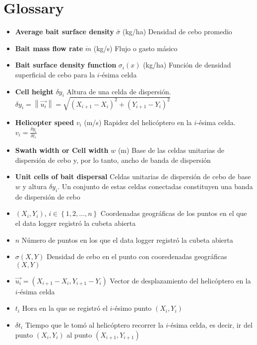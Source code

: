 \section{Glossary}
\begin{itemize}
  \item \textbf{Average bait surface density} $\bar{\sigma}$ (kg/ha) Densidad de cebo promedio

  \item \textbf{Bait mass flow rate} $\dot{m}$ (kg/s) Flujo o gasto m\'asico

  \item \textbf{Bait surface density function} $\sigma_i(x)$ (kg/ha) Funci\'on de densidad superficial de cebo para la $i$-\'esima celda

  \item \textbf{Cell height} $\delta y_i$ Altura de una celda de dispersi\'on. $\delta y_i=\left\|\vec{u_i}\right\|=\sqrt{\left(X_{i+1}-X_i\right)^2+\left(Y_{i+1}-Y_i\right)^2}$

  \item \textbf{Helicopter speed} $v_i$ (m/s) Rapidez del helic\'optero en la $i$-\'esima celda. $v_i=\frac{\delta y_i}{\delta t_i}$

  \item \textbf{Swath width or Cell width} $w$ (m) Base de las celdas unitarias de dispersi\'on de cebo y, por lo tanto, ancho de banda de dispersi\'on

  \item \textbf{Unit cells of bait dispersal} Celdas unitarias de dispersi\'on de cebo de base $w$ y altura $\delta y_i$. Un conjunto de estas celdas conectadas constituyen una banda de dispersi\'on de cebo

  \item $(X_i,Y_i)$, $i\in \left\{1,2,\ldots,n\right\}$ Coordenadas geogr\'aficas de los puntos en el que el data logger registr\'o la cubeta abierta

  \item $n$ N\'umero de puntos en los que el data logger registr\'o la cubeta abierta

  \item $\sigma(X,Y)$ Densidad de cebo en el punto con cooredenadas geogr\'aficas $(X,Y)$

  \item $\vec{u_i}=\left(X_{i+1}-X_i, Y_{i+1}-Y_i\right)$ Vector de desplazamiento del helic\'optero en la $i$-\'esima celda

  \item $t_i$ Hora en la que se registr\'o el $i$-\'esimo punto $(X_i,Y_i)$

  \item $\delta t_i$ Tiempo que le tom\'o al helic\'optero recorrer la $i$-\'esima celda, es decir, ir del punto $(X_i,Y_i)$ al punto $(X_{i+1},Y_{i+1})$
\end{itemize}
